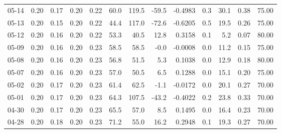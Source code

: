 \begin{threeparttable}
{\begin{tabular}{lrrrrrrrrrrrr}
  05-14 &          0.20 &          0.17 &          0.20 &        0.22 &                60.0 &               119.5 &      -59.5 &      -0.4983 &                 0.3 &             30.1 &            0.38 &                  75.00 \\
  05-13 &          0.20 &          0.15 &          0.20 &        0.22 &                44.4 &               117.0 &      -72.6 &      -0.6205 &                 0.5 &             19.5 &            0.26 &                  75.00 \\
  05-12 &          0.20 &          0.16 &          0.20 &        0.22 &                53.3 &                40.5 &       12.8 &       0.3158 &                 0.1 &              5.2 &            0.07 &                  80.00 \\
  05-09 &          0.20 &          0.16 &          0.20 &        0.23 &                58.5 &                58.5 &       -0.0 &      -0.0008 &                 0.0 &             11.2 &            0.15 &                  75.00 \\
  05-08 &          0.20 &          0.16 &          0.20 &        0.23 &                56.8 &                51.5 &        5.3 &       0.1038 &                 0.0 &             12.9 &            0.18 &                  80.00 \\
  05-07 &          0.20 &          0.16 &          0.20 &        0.23 &                57.0 &                50.5 &        6.5 &       0.1288 &                 0.0 &             15.1 &            0.20 &                  75.00 \\
  05-02 &          0.20 &          0.17 &          0.20 &        0.23 &                61.4 &                62.5 &       -1.1 &      -0.0172 &                 0.0 &             20.1 &            0.27 &                  70.00 \\
  05-01 &          0.20 &          0.17 &          0.20 &        0.23 &                64.3 &               107.5 &      -43.2 &      -0.4022 &                 0.2 &             23.8 &            0.33 &                  70.00 \\
  04-30 &          0.20 &          0.17 &          0.20 &        0.23 &                65.5 &                57.0 &        8.5 &       0.1495 &                 0.0 &             16.4 &            0.23 &                  70.00 \\
  04-28 &          0.20 &          0.18 &          0.20 &        0.23 &                71.2 &                55.0 &       16.2 &       0.2948 &                 0.1 &             19.3 &            0.27 &                  70.00 \\

\end{tabular}}
\end{threeparttable}
